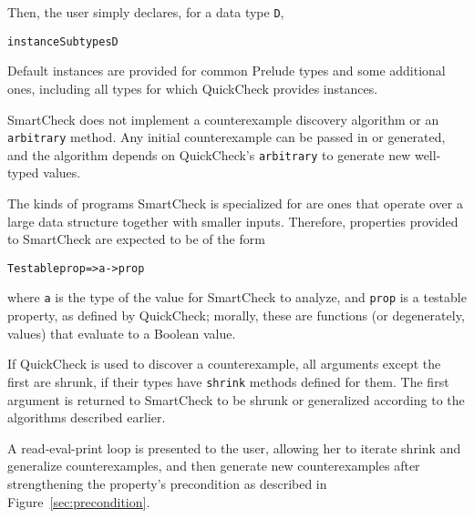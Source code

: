 \documentclass{sigplanconf}
\newenvironment{code}{\begin{alltt}\footnotesize}{\end{alltt}}
\newcommand{\ttp}[1]{\texttt{#1}}
\begin{document}
Then, the user simply declares, for a data type \ttp{D},
%
\begin{code}
instance Subtypes D
\end{code}
%
Default instances are provided for common Prelude types and some additional
ones, including all types for which QuickCheck provides instances.

SmartCheck does not implement a counterexample discovery algorithm or an
\ttp{arbitrary} method.  Any initial counterexample can be passed in or
generated, and the algorithm depends on QuickCheck's \ttp{arbitrary} to generate new
well-typed values.

The kinds of programs SmartCheck is specialized for are ones that operate over a
large data structure together with smaller inputs.  Therefore, properties
provided to SmartCheck are expected to be of the form
%
\begin{code}
Testable prop => a -> prop
\end{code}
%
where \ttp{a} is the type of the value for SmartCheck to analyze, and \ttp{prop}
is a testable property, as defined by QuickCheck; morally, these are functions
(or degenerately, values) that evaluate to a Boolean value.

If QuickCheck is used to discover a counterexample, all arguments except the
first are shrunk, if their types have \ttp{shrink} methods defined for them.
The first argument is returned to SmartCheck to be shrunk or generalized
according to the algorithms described earlier.


A read-eval-print loop is presented to the user, allowing her to iterate shrink
and generalize counterexamples, and then generate new counterexamples after
strengthening the property's precondition as described in
Figure~\ref{sec:precondition}.
\end{document}
